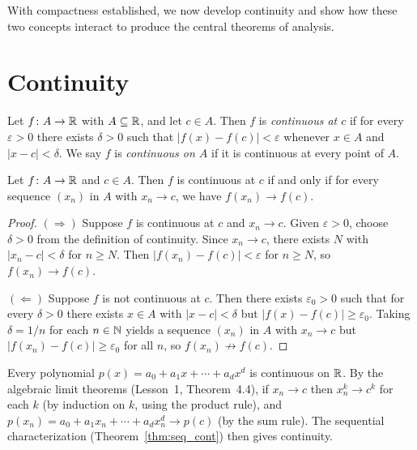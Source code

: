 \documentclass[11pt,a4paper]{article}
\begin{document}
With compactness established, we now develop continuity and show how
these two concepts interact to produce the central theorems of analysis.

\section{Continuity}
\label{sec:continuity}

\begin{definition}
\label{def:continuity}
Let $f \colon A \to \mathbb{R}$ with $A \subseteq \mathbb{R}$, and let $c \in A$. Then
$f$ is \emph{continuous at $c$} if for every $\varepsilon > 0$ there
exists $\delta > 0$ such that $|f(x) - f(c)| < \varepsilon$ whenever
$x \in A$ and $|x - c| < \delta$. We say $f$ is \emph{continuous on $A$}
if it is continuous at every point of $A$.
\end{definition}

\begin{theorem}
\label{thm:seq_cont}
Let $f \colon A \to \mathbb{R}$ and $c \in A$. Then $f$ is continuous at $c$ if
and only if for every sequence $(x_n)$ in $A$ with $x_n \to c$, we have
$f(x_n) \to f(c)$.
\end{theorem}

\begin{proof}
$(\Rightarrow)$ Suppose $f$ is continuous at $c$ and $x_n \to c$. Given
$\varepsilon > 0$, choose $\delta > 0$ from the definition of continuity.
Since $x_n \to c$, there exists $N$ with $|x_n - c| < \delta$ for
$n \ge N$. Then $|f(x_n) - f(c)| < \varepsilon$ for $n \ge N$, so
$f(x_n) \to f(c)$.

$(\Leftarrow)$ Suppose $f$ is not continuous at $c$. Then there exists
$\varepsilon_0 > 0$ such that for every $\delta > 0$ there exists
$x \in A$ with $|x - c| < \delta$ but $|f(x) - f(c)| \ge \varepsilon_0$.
Taking $\delta = 1/n$ for each $n \in \mathbb{N}$ yields a sequence $(x_n)$ in
$A$ with $x_n \to c$ but $|f(x_n) - f(c)| \ge \varepsilon_0$ for all
$n$, so $f(x_n) \not\to f(c)$.
\end{proof}

\begin{example}
\label{ex:cont_polynomial}
Every polynomial $p(x) = a_0 + a_1 x + \cdots + a_d x^d$ is continuous
on $\mathbb{R}$. By the algebraic limit theorems (Lesson~1, Theorem~4.4), if
$x_n \to c$ then $x_n^k \to c^k$ for each $k$ (by induction on $k$,
using the product rule), and
$p(x_n) = a_0 + a_1 x_n + \cdots + a_d x_n^d \to p(c)$ (by the sum
rule). The sequential characterization
(Theorem~\ref{thm:seq_cont}) then gives continuity.
\end{example}
\end{document}
